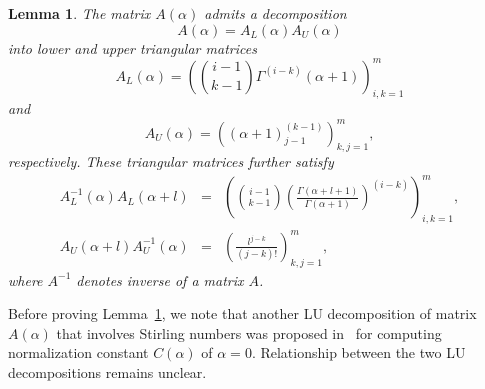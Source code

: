 \documentclass[pdflatex,sn-mathphys-num]{sn-jnl}%
\theoremstyle{thmstyleone}
\newtheorem{lemma}{Lemma}
\begin{document}
\begin{lemma}\label{l:de}
The matrix $A(\alpha)$ admits a decomposition
\begin{equation}\label{eq:LU}
A(\alpha)=A_{L}(\alpha)A_{U}(\alpha)
\end{equation}
into lower and upper triangular matrices
\begin{equation}\label{eq:L}
A_{L}(\alpha)=\left(\binom{i-1}{k-1}\Gamma^{(i-k)}(\alpha+1)\right)_{i,k=1}^{m}
\end{equation}
and
\begin{equation}
A_{U}(\alpha)=\left((\alpha+1)_{j-1}^{(k-1)}\right)_{k,j=1}^{m},
\end{equation}
respectively. These triangular matrices further satisfy
\begin{eqnarray}
A_{L}^{-1}(\alpha)A_{L}(\alpha+l) &=& \left(\binom{i-1}{k-1}\left(\frac{\Gamma(\alpha+l+1)}{\Gamma(\alpha+1)}\right)^{(i-k)}\right)_{i,k=1}^{m}, \label{eq:LL}  \\
A_{U}(\alpha+l)A_{U}^{-1}(\alpha) &=& \left(\frac{l^{j-k}}{(j-k)!}\right)_{k,j=1}^{m}, \label{eq:UU}
\end{eqnarray}
where $A^{-1}$ denotes inverse of a matrix $A$.
\end{lemma}

Before proving Lemma~\ref{l:de}, we note that another LU decomposition of matrix $A(\alpha)$ that involves Stirling numbers was proposed in~\cite{Cheliotis18} for computing normalization constant $C(\alpha)$ of $\alpha=0$. Relationship between the two LU decompositions remains unclear. 
\end{document}
